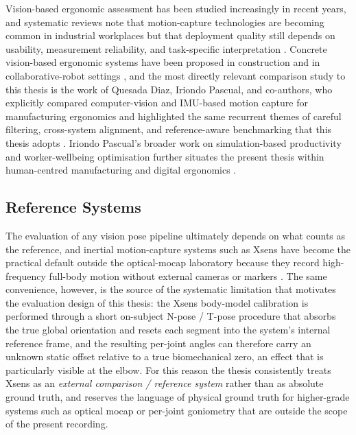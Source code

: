 \documentclass[12pt,a4paper]{article}
\begin{document}
Vision-based ergonomic assessment has been studied increasingly in recent
years, and systematic reviews note that motion-capture technologies are
becoming common in industrial workplaces but that deployment quality still
depends on usability, measurement reliability, and task-specific
interpretation \cite{menolotto2020motion}.
Concrete vision-based ergonomic systems have been proposed in
construction \cite{yu2019joint} and in collaborative-robot settings
\cite{menanno2024ergonomic}, and the most directly relevant comparison study
to this thesis is the work of Quesada Diaz, Iriondo Pascual, and co-authors,
who explicitly compared computer-vision and IMU-based motion capture for
manufacturing ergonomics and highlighted the same recurrent themes of
careful filtering, cross-system alignment, and reference-aware benchmarking
that this thesis adopts \cite{quesada2026supporting}.
Iriondo Pascual's broader work on simulation-based productivity and
worker-wellbeing optimisation further situates the present thesis within
human-centred manufacturing and digital ergonomics
\cite{iriondo2024development,iriondo2025integrating}.

\subsection{Reference Systems}

The evaluation of any vision pose pipeline ultimately depends on what counts
as the reference, and inertial motion-capture systems such as Xsens have
become the practical default outside the optical-mocap laboratory because
they record high-frequency full-body motion without external cameras or
markers \cite{roetenberg2009xsens,filippeschi2017survey}.
The same convenience, however, is the source of the systematic limitation
that motivates the evaluation design of this thesis: the Xsens body-model
calibration is performed through a short on-subject N-pose / T-pose
procedure that absorbs the true global orientation and resets each segment
into the system's internal reference frame, and the resulting per-joint
angles can therefore carry an unknown static offset relative to a true
biomechanical zero, an effect that is particularly visible at the elbow.
For this reason the thesis consistently treats Xsens as an
\emph{external comparison / reference system} rather than as absolute
ground truth, and reserves the language of physical ground truth for
higher-grade systems such as optical mocap or per-joint goniometry that are
outside the scope of the present recording.
\end{document}
